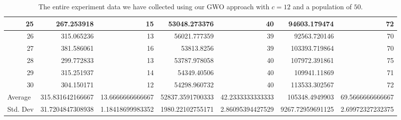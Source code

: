 \begin{table}
\begin{adjustwidth}{}{}
{{\begin{tabular}{|r|r|r|r|r|r|r|}
					\hline
					25                                         & 267.253918                   & 15                                    & 53048.273376                   & 40                                    & 94603.179474                 & 72                                     \\ 
					\hline
					26                                         & 315.065236                   & 13                                    & 56021.777359                   & 39                                    & 92563.720146                 & 70                                     \\ 
					\hline
					27                                         & 381.586061                   & 16                                    & 53813.8256                     & 39                                    & 103393.719864                & 70                                     \\ 
					\hline
					28                                         & 299.772833                   & 13                                    & 53787.978058                   & 40                                    & 107972.391861                & 75                                     \\ 
					\hline
					29                                         & 315.251937                   & 14                                    & 54349.40506                    & 40                                    & 109941.11869                 & 71                                     \\ 
					\hline
					30                                         & 304.150171                   & 12                                    & 54298.960732                   & 40                                    & 113533.302567                & 72                                     \\ 
					\hline
					\multicolumn{1}{|l|}{Average}              & 315.831642166667             & 13.6666666666667                      & 52837.3591700333               & 42.2333333333333                      & 105348.4949903               & 69.5666666666667                       \\ 
					\hline
					\multicolumn{1}{|l|}{Std. Dev}             & 31.7204847308938             & 1.18418699983352                      & 1980.22102755171               & 2.86095394427529                      & 9267.72959691125             & 2.69972327232375                       \\
					\hline
		\end{tabular}}}
	\end{adjustwidth}
	\caption{The entire experiment data we have collected using our GWO approach with $c = 12$ and a population of $50$.}
	\label{full-data-gwo-c12-p50}
\end{table}


